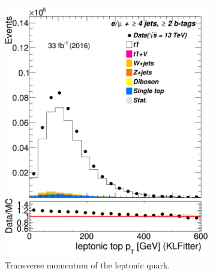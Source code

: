 \begin{figure}
	\begin{subfigure}{0.25\textwidth}
		\includegraphics[width=\linewidth]{ControlPlots_emujets_2016_4incl_2incl/klf_topLep_pt_emujets_2016.png}
		\caption{Transverse momentum of the leptonic quark.} \label{fig:K15}
	\end{subfigure}	\hspace*{0.5cm}
	\begin{subfigure}{0.25\textwidth}

\end{subfigure}
\end{figure}
